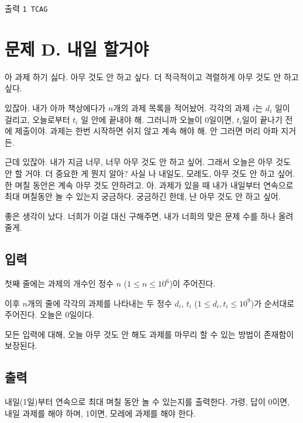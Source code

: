 \documentclass{article}
\begin{document}
출력
\bgroup\obeylines
\texttt{1
	TCAG\newline}
\egroup

\newpage



\section{문제 D. 내일 할거야}
아 과제 하기 싫다. 아무 것도 안 하고 싶다. 더 적극적이고 격렬하게 아무 것도 안 하고 싶다. \newline

있잖아. 내가 아까 책상에다가 $n$개의 과제 목록을 적어놨어. 각각의 과제 $i$는 $d_i$ 일이 걸리고, 오늘로부터 $t_i$ 일 안에 끝내야 해. 그러니까 오늘이 0일이면, $t_i$일이 끝나기 전에 제출이야. 과제는 한번 시작하면 쉬지 않고 계속 해야 해. 안 그러면 머리 아파 지거든. \newline

근데 있잖아. 내가 지금 너무, 너무 아무 것도 안 하고 싶어. 그래서 오늘은 아무 것도 안 할 거야. 더 중요한 게 뭔지 알아? 사실 나 내일도, 모레도, 아무 것도 안 하고 싶어. 한 며칠 동안은 계속 아무 것도 안하려고. 아. 과제가 있을 때 내가 내일부터 연속으로 최대 며칠동안 놀 수 있는지 궁금하다. 궁금하긴 한데, 난 아무 것도 안 하고 싶어. \newline

좋은 생각이 났다. 너희가 이걸 대신 구해주면, 내가 너희의 맞은 문제 수를 하나 올려줄게.

\subsection{입력}
첫째 줄에는 과제의 개수인 정수 $n$ ($1 \leq n \leq 10^6$)이 주어진다. \newline

이후 $n$개의 줄에 각각의 과제를 나타내는 두 정수 $d_i$, $t_i$ ($1 \leq d_i, t_i \leq 10^9$)가 순서대로 주어진다. 오늘은 0일이다. \newline

모든 입력에 대해, 오늘 아무 것도 안 해도 과제를 마무리 할 수 있는 방법이 존재함이 보장된다.

\subsection{출력}
내일(1일)부터 연속으로 최대 며칠 동안 놀 수 있는지를 출력한다. 가령, 답이 0이면, 내일 과제를 해야 하며, 1이면, 모레에 과제를 해야 한다.
\end{document}
